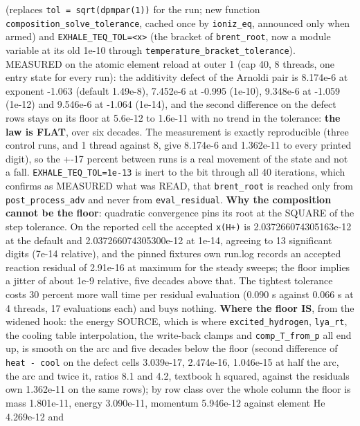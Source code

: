 \documentclass[english,a4paper]{my_memo}
\begin{document}
\begin{itemize}
  (replaces \texttt{tol\ =\ sqrt(dpmpar(1))} for the run; new function
  \texttt{composition\_solve\_tolerance}, cached once by \texttt{ioniz\_eq}, announced only
  when armed) and \texttt{EXHALE\_TEQ\_TOL=\textless{}x\textgreater{}} (the bracket of \texttt{brent\_root}, now a
  module variable at its old 1e-10 through
  \texttt{temperature\_bracket\_tolerance}). MEASURED on the atomic element reload
  at outer 1 (cap 40, 8 threads, one entry state for every run): the
  additivity defect of the Arnoldi pair is 8.174e-6 at exponent -1.063
  (default 1.49e-8), 7.452e-6 at -0.995 (1e-10), 9.348e-6 at -1.059
  (1e-12) and 9.546e-6 at -1.064 (1e-14), and the second difference on the
  defect rows stays on its floor at 5.6e-12 to 1.6e-11 with no trend in
  the tolerance: \textbf{the law is FLAT}, over six decades. The measurement is
  exactly reproducible (three control runs, and 1 thread against 8, give
  8.174e-6 and 1.362e-11 to every printed digit), so the +-17 percent
  between runs is a real movement of the state and not a fall.
  \texttt{EXHALE\_TEQ\_TOL=1e-13} is inert to the bit through all 40 iterations,
  which confirms as MEASURED what was READ, that \texttt{brent\_root} is reached
  only from \texttt{post\_process\_adv} and never from \texttt{eval\_residual}. \textbf{Why the
  composition cannot be the floor}: quadratic convergence pins its root
  at the SQUARE of the step tolerance. On the reported cell the accepted
  \texttt{x(H+)} is 2.037266074305163e-12 at the default and
  2.037266074305300e-12 at 1e-14, agreeing to 13 significant digits (7e-14
  relative), and the pinned fixture\textquotesingle s own run.log records an accepted
  reaction residual of 2.91e-16 at maximum for the steady sweeps; the
  floor implies a jitter of about 1e-9 relative, five decades above that.
  The tightest tolerance costs 30 percent more wall time per residual
  evaluation (0.090 s against 0.066 s at 4 threads, 17 evaluations each)
  and buys nothing. \textbf{Where the floor IS}, from the widened hook: the
  energy SOURCE, which is where \texttt{excited\_hydrogen}, \texttt{lya\_rt}, the cooling
  table interpolation, the write-back clamps and \texttt{comp\_T\_from\_p} all end
  up, is smooth on the arc and five decades below the floor (second
  difference of \texttt{heat\ -\ cool} on the defect cells 3.039e-17, 2.474e-16,
  1.046e-15 at half the arc, the arc and twice it, ratios 8.1 and 4.2,
  textbook h squared, against the residual\textquotesingle s own 1.362e-11 on the same
  rows); by row class over the whole column the floor is mass 1.801e-11,
  energy 3.090e-11, momentum 5.946e-12 against element He 4.269e-12 and

\end{itemize}
\end{document}
